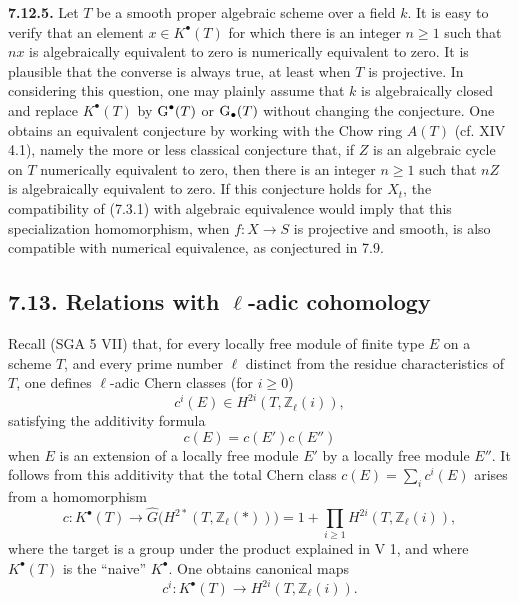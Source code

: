 \textbf{7.12.5.}
Let $T$ be a smooth proper algebraic scheme over a field $k$. It is easy to
verify that an element $x\in K^\bullet(T)$ for which there is an integer
$n\geq1$ such that $nx$ is algebraically equivalent to zero is numerically
equivalent to zero. It is plausible that the converse is always true, at
least when $T$ is projective. In considering this question, one may plainly
assume that $k$ is algebraically closed and replace $K^\bullet(T)$ by
$\operatorname{G}^\bullet(T)$ or $\operatorname{G}_\bullet(T)$ without changing the conjecture. One
obtains an equivalent conjecture by working with the Chow ring $A(T)$
(cf. XIV 4.1), namely the more or less classical conjecture that, if $Z$ is an
algebraic cycle on $T$ numerically equivalent to zero, then there is an
integer $n\geq1$ such that $nZ$ is algebraically equivalent to zero. If this
conjecture holds for $X_t$, the compatibility of (7.3.1) with algebraic
equivalence would imply that this specialization homomorphism, when
$f:X\to S$ is projective and smooth, is also compatible with numerical
equivalence, as conjectured in 7.9.

\subsection*{7.13. Relations with $\ell$-adic cohomology}
Recall (SGA 5 VII) that, for every locally free module of finite type $E$ on
a scheme $T$, and every prime number $\ell$ distinct from the residue
characteristics of $T$, one defines $\ell$-adic Chern classes (for $i\geq0$)
\[
c^i(E)\in H^{2i}(T,\mathbb Z_\ell(i)),
\]
satisfying the additivity formula
\[
c(E)=c(E')c(E'')
\]
when $E$ is an extension of a locally free module $E'$ by a locally free
module $E''$. It follows from this additivity that the total Chern class
$c(E)=\sum_i c^i(E)$ arises from a homomorphism
\begin{equation}\tag{7.13.0}
c:K^\bullet(T)\longrightarrow
\widehat G\bigl(H^{2*}(T,\mathbb Z_\ell(*))\bigr)
=1+\prod_{i\geq1}H^{2i}(T,\mathbb Z_\ell(i)),
\end{equation}
where the target is a group under the product explained in V 1, and where
$K^\bullet(T)$ is the ``naive'' $K^\bullet$. One obtains canonical maps
\begin{equation}\tag{7.13.1}
c^i:K^\bullet(T)\longrightarrow H^{2i}(T,\mathbb Z_\ell(i)).
\end{equation}

